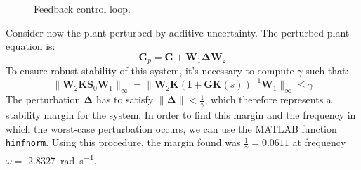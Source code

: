 \documentclass{scrreprt}
\begin{document}
\begin{figure}[h]
    \centering
    \caption{Feedback control loop.}
    \label{fig:control_loop}
\end{figure}

Consider now the plant perturbed by additive uncertainty. The perturbed plant equation is:
\begin{equation}
    \boldsymbol{G}_{p} = \boldsymbol{G} + \boldsymbol{W}_{1}\boldsymbol{\Delta}\boldsymbol{W}_2
\end{equation}
To ensure robust stability of this system, it's necessary to compute $\gamma$ such that:
\begin{equation}
    \| \boldsymbol{W}_2 \boldsymbol{K} \boldsymbol{S}_0 \boldsymbol{W}_1 \|_\infty = \| \boldsymbol{W}_2 \boldsymbol{K}(\boldsymbol{I} + \boldsymbol{G}\boldsymbol{K}(s))^{-1}  \boldsymbol{W}_1 \|_\infty \leq \gamma
\end{equation}
The perturbation $\boldsymbol{\Delta}$ has to satisfy $\|\boldsymbol{\Delta}\|<\frac{1}{\gamma}$, which therefore represents a stability margin for the system.
In order to find this margin and the frequency in which the worst-case perturbation occurs, we can use the MATLAB function \texttt{hinfnorm}. Using this procedure, the margin found was $\frac{1}{\gamma} = 0.0611$ at frequency $\omega=$ \SI[per-mode=fraction]{2.8327}{\radian\per\second}.
\end{document}
